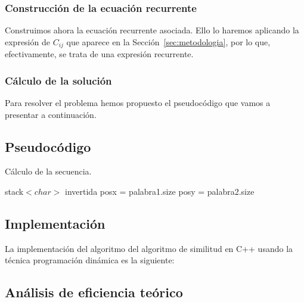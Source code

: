 \subsubsection{Construcción de la ecuación recurrente}

Construimos ahora la ecuación recurrente asociada. Ello lo haremos aplicando
la expresión de $C_{ij}$ que aparece en la Sección~\ref{sec:metodologia}, por lo
que, efectivamente, se trata de una expresión recurrente. 

\subsubsection{Cálculo de la solución}

Para resolver el problema hemos propuesto el pseudocódigo que vamos a presentar
a continuación. 

\subsection{Pseudocódigo}

\begin{algorithm}[H]
  \caption{Cálculo de la secuencia.}

  stack$<char>$ invertida\;
  posx = palabra1.size\;
  posy = palabra2.size\;

\end{algorithm}

\subsection{Implementación}

La implementación del algoritmo del algoritmo de similitud en C++ usando la técnica programación dinámica es la siguiente:





\subsection{Análisis de eficiencia teórico}

